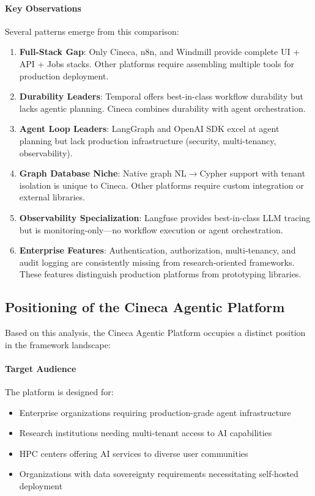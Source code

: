 \documentclass[a4paper,twoside]{sapthesis}
\begin{document}
\paragraph{Key Observations}

Several patterns emerge from this comparison:

\begin{enumerate}
    \item \textbf{Full-Stack Gap}: Only Cineca, n8n, and Windmill provide complete UI + API + Jobs stacks. Other platforms require assembling multiple tools for production deployment.
    
    \item \textbf{Durability Leaders}: Temporal offers best-in-class workflow durability but lacks agentic planning. Cineca combines durability with agent orchestration.
    
    \item \textbf{Agent Loop Leaders}: LangGraph and OpenAI SDK excel at agent planning but lack production infrastructure (security, multi-tenancy, observability).
    
    \item \textbf{Graph Database Niche}: Native graph NL$\rightarrow$Cypher support with tenant isolation is unique to Cineca. Other platforms require custom integration or external libraries.
    
    \item \textbf{Observability Specialization}: Langfuse provides best-in-class LLM tracing but is monitoring-only---no workflow execution or agent orchestration.
    
    \item \textbf{Enterprise Features}: Authentication, authorization, multi-tenancy, and audit logging are consistently missing from research-oriented frameworks. These features distinguish production platforms from prototyping libraries.
\end{enumerate}

\subsection{Positioning of the Cineca Agentic Platform}

Based on this analysis, the Cineca Agentic Platform occupies a distinct position in the framework landscape:

\paragraph{Target Audience}
The platform is designed for:
\begin{itemize}
    \item Enterprise organizations requiring production-grade agent infrastructure
    \item Research institutions needing multi-tenant access to AI capabilities
    \item HPC centers offering AI services to diverse user communities
    \item Organizations with data sovereignty requirements necessitating self-hosted deployment
\end{itemize}
\end{document}
